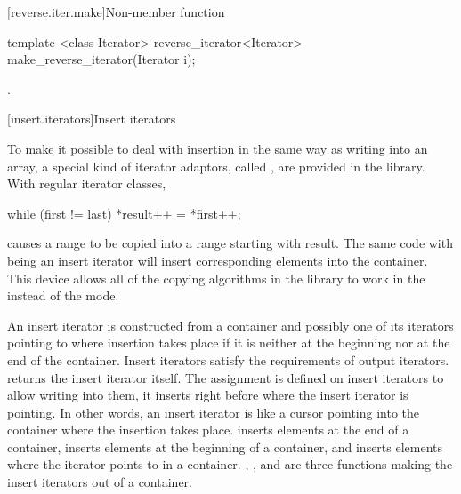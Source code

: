 [reverse.iter.make]{Non-member function }

%
\begin{itemdecl}
template <class Iterator>
  reverse_iterator<Iterator> make_reverse_iterator(Iterator i);
\end{itemdecl}

\begin{itemdescr}
\pnum
\returns
{}.
\end{itemdescr}

[insert.iterators]{Insert iterators}

\pnum
To make it possible to deal with insertion in the same way as writing into an array, a special kind of iterator
adaptors, called
,
are provided in the library.
With regular iterator classes,

\begin{codeblock}
while (first != last) *result++ = *first++;
\end{codeblock}

causes a range 
to be copied into a range starting with result.
The same code with
being an insert iterator will insert corresponding elements into the container.
This device allows all of the
copying algorithms in the library to work in the
instead of the  mode.

\pnum
An insert iterator is constructed from a container and possibly one of its iterators pointing to where
insertion takes place if it is neither at the beginning nor at the end of the container.
Insert iterators satisfy the requirements of output iterators.
returns the insert iterator itself.
The assignment
is defined on insert iterators to allow writing into them, it inserts
right before where the insert iterator is pointing.
In other words, an insert iterator is like a cursor pointing into the
container where the insertion takes place.
inserts elements at the end of a container,
inserts elements at the beginning of a container, and
inserts elements where the iterator points to in a container.
,
,
and
are three
functions making the insert iterators out of a container.

